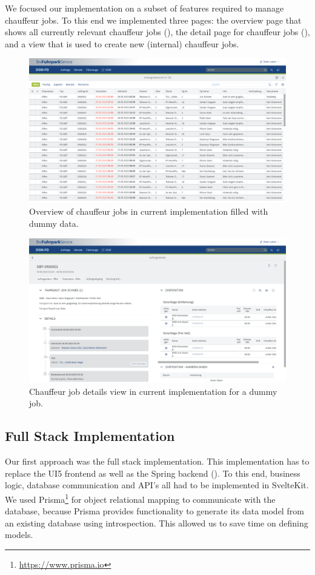 We focused our implementation on a subset of features required to manage chauffeur jobs. To this end we implemented three pages: the overview page that shows all currently relevant chauffeur jobs (), the detail page for chauffeur jobs (), and a view that is used to create new (internal) chauffeur jobs.

\begin{figure}
    \centering
    \includegraphics[width=\linewidth]{assets/current-auftrag-overview}
    \caption{Overview of chauffeur jobs in current implementation filled with dummy data.}
    \label{fig:current-overview-auftrag}
\end{figure}

\begin{figure}
    \centering
    \includegraphics[width=\linewidth]{assets/current-auftrag-details}
    \caption{Chauffeur job details view in current implementation for a dummy job.}
    \label{fig:current-details-auftrag}
\end{figure}


\subsection{Full Stack Implementation}
Our first approach was the full stack implementation. This implementation has to replace the UI5 frontend as well as the Spring backend (). To this end, business logic, database communication and API's all had to be implemented in SvelteKit. We used Prisma\footnote{\url{https://www.prisma.io}} for object relational mapping to communicate with the database, because Prisma provides functionality to generate its data model from an existing database using introspection. This allowed us to save time on defining models. 

